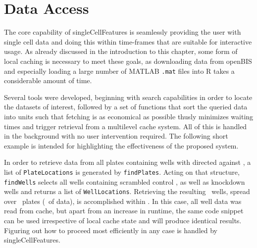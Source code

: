 \section{Data Access}
\label{sec:data-access}
The core capability of singleCellFeatures is seamlessly providing the user with single cell data and doing this within time-frames that are suitable for interactive usage. As already discussed in the introduction to this chapter, some form of local caching is necessary to meet these goals, as downloading data from openBIS and especially loading a large number of MATLAB \texttt{.mat} files into R takes a considerable amount of time.

Several tools were developed, beginning with search capabilities in order to locate the datasets of interest, followed by a set of functions that sort the queried data into units such that fetching is as economical as possible thusly minimizes waiting times and trigger retrieval from a multilevel cache system. All of this is handled in the background with no user intervention required. The following short example is intended for highlighting the effectiveness of the proposed system.



In order to retrieve data from all plates containing wells with  directed against , a list of \texttt{PlateLocations} is generated by \texttt{findPlates}. Acting on that structure, \texttt{findWells} selects all wells containing scrambled control , as well as  knockdown wells and returns a list of \texttt{WellLocations}. Retrieving the resulting \knitrScfFindGetDemoLengthW\ wells, spread over \knitrScfFindGetDemoLengthP\ plates (\knitrScfFindGetDemoSize\ of data), is accomplished within \knitrScfFindGetDemoTime. In this case, all well data was read from cache, but apart from an increase in runtime, the same code snippet can be used irrespective of local cache state and will produce identical results. Figuring out how to proceed most efficiently in any case is handled by singleCellFeatures.

